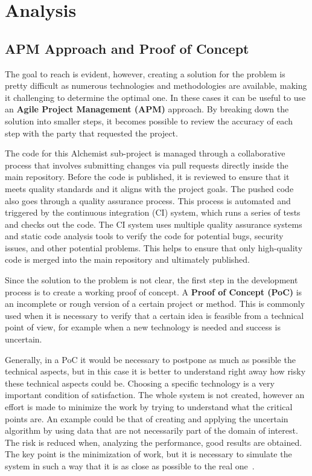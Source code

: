 \chapter{Analysis}
\label{chap:analysis}
\section{APM Approach and Proof of Concept}
\label{sec:apm-approach-and-proof-of-concept}
The goal to reach is evident, however, creating a solution for the problem is pretty difficult as numerous technologies and methodologies are available, making it challenging to determine the optimal one. In these cases it can be useful to use an \textbf{Agile Project Management (APM)} approach. By breaking down the solution into smaller steps, it becomes possible to review the accuracy of each step with the party that requested the project.\newline

The code for this Alchemist sub-project is managed through a collaborative process that involves submitting changes via pull requests directly inside the main repository. Before the code is published, it is reviewed to ensure that it meets quality standards and it aligns with the project goals. The pushed code also goes through a quality assurance process. This process is automated and triggered by the continuous integration (CI) system, which runs a series of tests and checks out the code. The CI system uses multiple quality assurance systems and static code analysis tools to verify the code for potential bugs, security issues, and other potential problems. This helps to ensure that only high-quality code is merged into the main repository and ultimately published.\newline

Since the solution to the problem is not clear, the first step in the development process is to create a working proof of concept. A \textbf{Proof of Concept (PoC)} is an incomplete or rough version of a certain project or method. This is commonly used when it is necessary to verify that a certain idea is feasible from a technical point of view, for example when a new technology is needed and success is uncertain.\newline

Generally, in a PoC it would be necessary to postpone as much as possible the technical aspects, but in this case it is better to understand right away how risky these technical aspects could be. Choosing a specific technology is a very important condition of satisfaction. The whole system is not created, however an effort is made to minimize the work by trying to understand what the critical points are. An example could be that of creating and applying the uncertain algorithm by using data that are not necessarily part of the domain of interest. The risk is reduced when, analyzing the performance, good results are obtained. The key point is the minimization of work, but it is necessary to simulate the system in such a way that it is as close as possible to the real one~\cite{slides-scoping}.\newline

